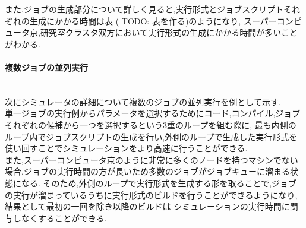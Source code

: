 また,ジョブの生成部分について詳しく見ると,実行形式とジョブスクリプトそれぞれの生成にかかる時間は表 ( TODO: 表を作る)のようになり,
スーパーコンピュータ京,研究室クラスタ双方において実行形式の生成にかかる時間が多いことがわかる.\\

\paragraph{複数ジョブの並列実行}~\\
次にシミュレータの詳細について複数のジョブの並列実行を例として示す.\\

単一ジョブの実行例からパラメータを選択するためにコード,コンパイル,ジョブそれぞれの候補から一つを選択するという3重のループを組む際に,
最も内側のループ内でジョブスクリプトの生成を行い,外側のループで生成した実行形式を使い回すことでシミュレーションをより高速に行うことができる.\\
また,スーパーコンピュータ京のように非常に多くのノードを持つマシンでない場合,ジョブの実行時間の方が長いため多数のジョブがジョブキューに溜まる状態になる.
そのため,外側のループで実行形式を生成する形を取ることで,ジョブの実行が溜まっているうちに実行形式のビルドを行うことができるようになり,結果として最初の一回を除き以降のビルドは
シミュレーションの実行時間に関与しなくすることができる.\\

